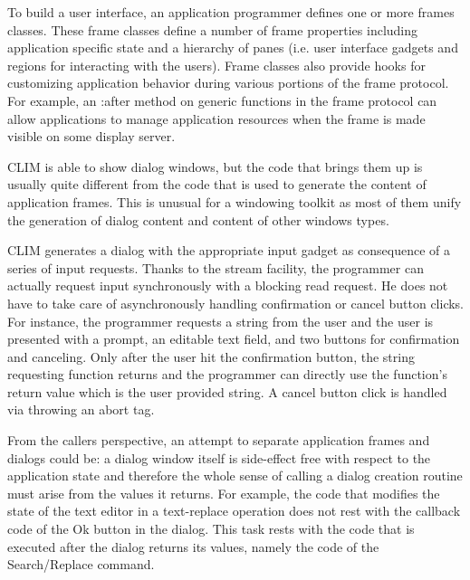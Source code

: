 \documentclass[twocolumn,a4paper]{article}
\newcommand {\code}[1]{{\sffamily #1}}
\newcommand {\CLIM}{{\small CLIM}}
\let\keyword\code
\begin{document}
To build a user interface, an application programmer defines one or
more frames classes. These frame classes define a number of frame
properties including application specific state and a hierarchy of
panes (i.e. user interface gadgets and regions for interacting with
the users). Frame classes also provide hooks for customizing
application behavior during various portions of the frame protocol.
For example, an \keyword{:after} method on generic functions in the
frame protocol can allow applications to manage application resources
when the frame is made visible on some display server.

\CLIM{} is able to show dialog windows, but the code that brings them
up is usually quite different from the code that is used to generate
the content of application frames. This is unusual for a windowing
toolkit as most of them unify the generation of dialog content and
content of other windows types.

\CLIM{} generates a dialog with the appropriate input gadget as
consequence of a series of input requests. Thanks to the stream
facility, the programmer can actually request input synchronously with
a blocking read request. He does not have to take care of
asynchronously handling confirmation or cancel button clicks.  For
instance, the programmer requests a string from the user and the user
is presented with a prompt, an editable text field, and two buttons
for confirmation and canceling. Only after the user hit the
confirmation button, the string requesting function returns and the
programmer can directly use the function's return value which is the
user provided string. A cancel button click is handled via throwing an
abort tag.

From the callers perspective, an attempt to separate application
frames and dialogs could be: a dialog window itself is side-effect
free with respect to the application state and therefore the whole
sense of calling a dialog creation routine must arise from the values
it returns. For example, the code that modifies the state of the text
editor in a text-replace operation does not rest with the callback
code of the Ok button in the dialog. This task rests with the code
that is executed after the dialog returns its values, namely the code
of the Search/Replace command.

\end{document}
